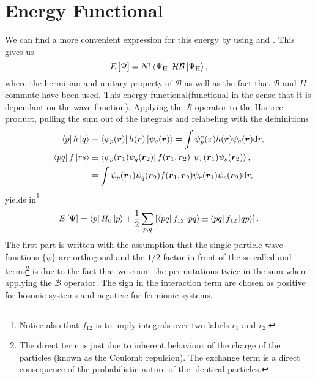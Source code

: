 \section{Energy Functional\label{sec:energyFunc}}
    We can find a more convenient expression for this energy by using
     and . This gives us
        \begin{equation}
            E\left[\Psi\right] =
            N!\bra{\Psi_{\text{H}}}\mathcal{H}\mathcal{B}\ket{\Psi_{\text{H}}},
        \end{equation}
    where the hermitian and unitary property of $\mathcal{B}$ as well as the
    fact that $\mathcal{B}$ and $H$ commute have been used. This energy
    functional(functional in the sense that it is dependant on the wave
    function). Applying the $\mathcal{B}$ operator to the Hartree-product,
    pulling the sum out of the integrals and relabeling with the defninitions
        \begin{equation}
            \begin{aligned}
                \bra{p}h\ket{q} &\equiv
                \bra{\psi_p(\boldsymbol{{r}})}h(\boldsymbol{{r}})\ket{\psi_q(\boldsymbol{{r}})} =
                \int\psi^{*}_p(x)h(\boldsymbol{{r}})\psi_q(\boldsymbol{{r}})\mathrm{d} r, \\
                \bra{pq}f\ket{rs} &\equiv
                \bra{\psi_p(\boldsymbol{{r}}_1)\psi_q(\boldsymbol{{r}}_2)}
                f(\boldsymbol{{r}}_1,\boldsymbol{{r}}_2)
                \ket{\psi_r(\boldsymbol{{r}}_1)\psi_s(\boldsymbol{{r}}_2)}, \nonumber \\
                &= \int \psi_p(\boldsymbol{{r}}_1)\psi_q(\boldsymbol{{r}}_2)
                f(\boldsymbol{{r}}_1,\boldsymbol{{r}}_2) \psi_r(\boldsymbol{{r}}_1)\psi_s(\boldsymbol{{r}}_2)
                \mathrm{d} r,
            \end{aligned}
            \label{eq:defhredefbleh}
        \end{equation}
    yields in\footnote{Notice also that $f_{12}$ is to imply integrals over two
    labels $r_1$ and $r_2$.}
        \begin{equation}
            E\left[\Psi\right] = \bra{p}H_0\ket{p} +
            \frac{1}{2}\sum_{p,q}\left[\bra{pq}f_{12}\ket{pq} \pm
            \bra{pq}f_{12}\ket{qp}\right].
            \label{eq:ch3Efunc}
        \end{equation}
    The first part is written with the assumption that the single-particle wave
    functions $\{\psi\}$ are orthogonal and the $1/2$ factor in front of the
    so-called  and  terms\footnote{The direct
    term is just due to inherent behaviour of the charge of the particles
    (known as the Coulomb repulsion). The exchange term is a direct consequence
    of the probabilistic nature of the identical particles.} is due to the fact
    that we count the permutations twice in the sum when applying the
    $\mathcal{B}$ operator. The sign in the interaction term are chosen as
    positive for bosonic systems and negative for fermionic systems.

